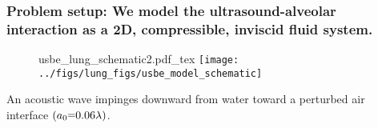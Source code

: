 \begin{frame} \frametitle{Problem setup: We model the ultrasound-alveolar interaction as a 2D, compressible, inviscid fluid system.}
  \begin{figure}
    \centering
    \def\svgwidth{0.48\textwidth}
    {\footnotesize
      {usbe_lung_schematic2.pdf_tex} \hfill%
    }
    \texttt{[image: ../figs/lung\_figs/usbe\_model\_schematic]} \hfill
  \end{figure}
  An acoustic wave impinges downward from water toward a perturbed air interface $(a_0\equals0.06\lambda)$.
\end{frame}
